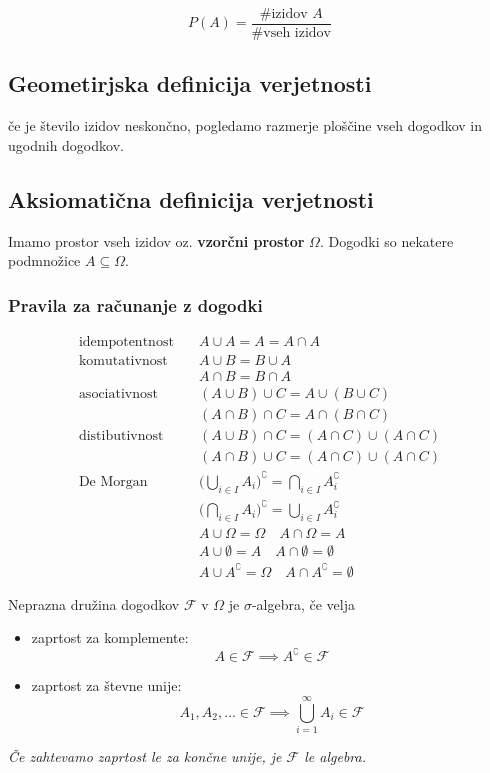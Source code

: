 \begin{multicols}{4}
\[ P(A) = \frac{\text{\# izidov }A}{\text{\# vseh izidov}}\]

\subsection{Geometirjska definicija verjetnosti}
če je število izidov neskončno, pogledamo razmerje ploščine vseh dogodkov in ugodnih dogodkov.

\subsection{Aksiomatična definicija verjetnosti}

Imamo prostor vseh izidov oz. \textbf{vzorčni prostor} $\Omega$. Dogodki so nekatere podmnožice $A \subseteq \Omega$.

\subsubsection{Pravila za računanje z dogodki}
\begin{align*}
	\text{idempotentnost} & \quad A \cup A = A = A \cap A \\
	\text{komutativnost} & \quad A \cup B = B \cup A \\
	& \quad A \cap B = B \cap A \\
	\text{asociativnost} & \quad (A \cup B) \cup C = A \cup ( B \cup C) \\
	& \quad (A \cap B) \cap C = A \cap ( B \cap C) \\
	\text{distibutivnost} & \quad (A \cup B) \cap C = (A \cap C) \cup ( A \cap C) \\
	& \quad (A \cap B) \cup C = (A \cap C) \cup ( A \cap C) \\
	\text{De Morgan} & \quad \big(\bigcup_{i\in I} A_i \big)^\complement = \bigcap_{i \in I} A_i^\complement  \\
	& \quad \big(\bigcap_{i\in I} A_i \big)^\complement = \bigcup_{i \in I} A_i^\complement \\
	& \quad A \cup \Omega = \Omega \quad  A \cap \Omega = A \\
	& \quad A \cup \emptyset = A \quad  A \cap \emptyset = \emptyset \\
	& \quad A \cup A^\complement = \Omega \quad A \cap A^\complement = \emptyset
\end{align*}


Neprazna družina dogodkov $\mathcal{F}$ v $\Omega$ je $\sigma$-algebra, če velja
\begin{itemize}
	\item zaprtost za komplemente: \[ A \in \mathcal{F} \implies A^\complement \in \mathcal{F} \]
	\item zaprtost za števne unije: \[ A_1, A_2, \dots \in \mathcal{F} \implies \bigcup_{i=1}^\infty A_i \in \mathcal{F} \]
\end{itemize}
\textit{Če zahtevamo zaprtost le za končne unije, je $\mathcal{F}$ le algebra.}


\end{multicols}
